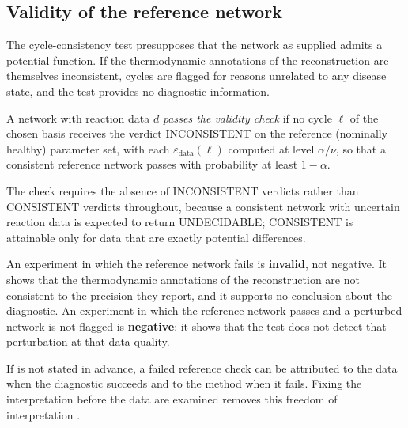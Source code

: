 \documentclass[11pt,a4paper]{article}
\theoremstyle{pstyle}
\theoremstyle{definition}
\theoremstyle{remark}
\newcommand{\eps}{\varepsilon}
\newcommand{\epsdata}{\eps_{\mathrm{data}}}
\begin{document}
\subsection{Validity of the reference network}
\label{sec:validity}

The cycle-consistency test presupposes that the network as supplied
admits a potential function. If the thermodynamic annotations of the
reconstruction are themselves inconsistent, cycles are flagged for
reasons unrelated to any disease state, and the test provides no
diagnostic information.

\begin{definition}
\label{def:validity}
A network with reaction data $d$ \emph{passes the validity check} if no
cycle $\ell$ of the chosen basis receives the verdict
\textsf{INCONSISTENT} on the reference (nominally healthy) parameter
set, with each $\epsdata(\ell)$ computed at level $\alpha/\nu$, so that
a consistent reference network passes with probability at least
$1-\alpha$.
\end{definition}

The check requires the absence of \textsf{INCONSISTENT} verdicts rather
than \textsf{CONSISTENT} verdicts throughout, because a consistent
network with uncertain reaction data is expected to return
\textsf{UNDECIDABLE}; \textsf{CONSISTENT} is attainable only for data
that are exactly potential differences.

\begin{criterion}
\label{crit:invalid}
An experiment in which the reference network fails
 is \textbf{invalid}, not negative. It shows that the
thermodynamic annotations of the reconstruction are not consistent to
the precision they report, and it supports no conclusion about the
diagnostic. An experiment in which the reference network passes and a
perturbed network is not flagged is \textbf{negative}: it shows that
the test does not detect that perturbation at that data quality.
\end{criterion}

\begin{remark}
\label{rem:preregister}
If  is not stated in advance, a failed reference
check can be attributed to the data when the diagnostic succeeds and to
the method when it fails. Fixing the interpretation before the data are
examined removes this freedom of interpretation
\citep{simmons2011,sandve2013}.
\end{remark}
\end{document}
